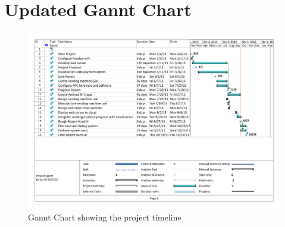 \chapter{Updated Gannt Chart}
\label{app:c}

\begin{figure}
 \centering 
 \includegraphics[clip=true, trim = 0 0 0 0,
 scale=0.68, angle=270]{gantt}
 \caption{Gannt Chart showing the project timeline}
 \label{fig:gannt}
\end{figure}